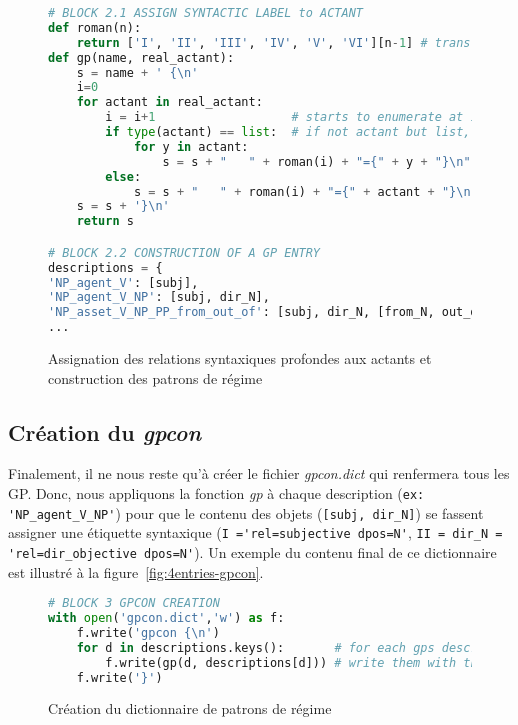 \begin{figure}[htb]
  \caption{Assignation des relations syntaxiques profondes aux actants et construction des patrons de régime}
	\label{}
\begin{lstlisting}[language=Python]
# BLOCK 2.1 ASSIGN SYNTACTIC LABEL to ACTANT
def roman(n):
    return ['I', 'II', 'III', 'IV', 'V', 'VI'][n-1] # transforms arabic numbers in roman numbers
def gp(name, real_actant):
    s = name + ' {\n'
    i=0
    for actant in real_actant:
        i = i+1                   # starts to enumerate at 1
        if type(actant) == list:  # if not actant but list, apply function to actants in list
            for y in actant:
                s = s + "   " + roman(i) + "={" + y + "}\n"
        else:
            s = s + "   " + roman(i) + "={" + actant + "}\n" # apply function to actant
    s = s + '}\n'
    return s 

# BLOCK 2.2 CONSTRUCTION OF A GP ENTRY
descriptions = {
'NP_agent_V': [subj],
'NP_agent_V_NP': [subj, dir_N],
'NP_asset_V_NP_PP_from_out_of': [subj, dir_N, [from_N, out_of_N]],
...
\end{lstlisting}
\end{figure}

\subsection{Création du \emph{gpcon}}

Finalement, il ne nous reste qu'à créer le fichier \emph{gpcon.dict} qui renfermera tous les \ac{GP}. Donc, nous appliquons la fonction \emph{gp} à chaque description (\lstinline|ex: 'NP_agent_V_NP'|) pour que le contenu des objets (\lstinline|[subj, dir_N]|) se fassent assigner une étiquette syntaxique (\lstinline|I ='rel=subjective dpos=N'|, \lstinline|II = dir_N = 'rel=dir_objective dpos=N'|). Un exemple du contenu final de ce dictionnaire est illustré à la figure~\ref{fig:4entries-gpcon}.

\begin{figure}[htb]
  \caption{Création du dictionnaire de patrons de régime}
	\label{}
\begin{lstlisting}[language=Python]
# BLOCK 3 GPCON CREATION
with open('gpcon.dict','w') as f: 
    f.write('gpcon {\n')
    for d in descriptions.keys():       # for each gps descriptions,
        f.write(gp(d, descriptions[d])) # write them with the correct syntactic label
    f.write('}')
\end{lstlisting}
\end{figure}

